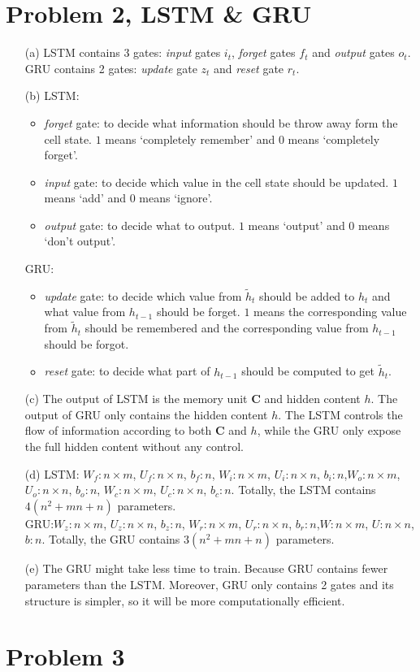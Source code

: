 \documentclass[twoside]{article}
\begin{document}
\section{Problem 2, LSTM \& GRU}
\begin{itemize}
\item[(a)] LSTM contains 3 gates: \emph{input} gates $i_t$, \emph{forget} gates $f_t$ and \emph{output} gates $o_t$.\\
GRU contains 2 gates: \emph{update} gate $z_t$ and \emph{reset} gate $r_t$.
\item[(b)]LSTM:
\begin{itemize}
	\item \emph{forget} gate: to decide what information should be throw away form the cell state. $1$ means `completely remember' and $0$ means `completely forget'.
	\item \emph{input} gate: to decide which value in the cell state should be updated.  $1$ means `add' and $0$ means `ignore'.
	\item \emph{output} gate: to decide what to output. $1$ means `output' and $0$ means `don't output'.
\end{itemize}
GRU:
\begin{itemize}
	\item \emph{update} gate: to decide which value from $\tilde{h}_t$ should be added to $h_t$ and what value from $h_{t-1}$ should be forget. $1$ means the corresponding value from  $\tilde{h}_t$ should be remembered and the corresponding value from $h_{t-1}$ should be forgot.
	\item \emph{reset} gate: to decide what part of $h_{t-1}$ should be computed to get $\tilde{h}_t$.
\end{itemize}
\item [(c)] The output of LSTM is the memory unit $\bm{C}$ and hidden content $h$. The output of GRU only contains the hidden content $h$.
The LSTM controls the flow of information according to  both $\bm{C}$ and $h$, while the GRU only expose the full hidden content without any control.
\item [(d)]
LSTM: $W_f: n\times m$, $U_f: n\times n$, $b_f: n$, $W_i: n\times m$, $U_i: n\times n$, $b_i: n$,$W_o: n\times m$, $U_o: n\times n$, $b_o: n$, $W_c: n\times m$, $U_c: n\times n$, $b_c: n$. Totally, the LSTM contains $4(n^2+mn+n)$ parameters.\\
GRU:$W_z: n\times m$, $U_z: n\times n$, $b_z: n$, $W_r: n\times m$, $U_r: n\times n$, $b_r: n$,$W: n\times m$, $U: n\times n$, $b: n$. Totally, the GRU contains $3(n^2+mn+n)$ parameters.
\item[(e)] The GRU might take less time to train. Because GRU contains fewer parameters than the LSTM. Moreover, GRU only contains 2 gates and its structure is simpler, so it will be more computationally efficient.
\end{itemize}


\section{Problem 3}
\end{document}

